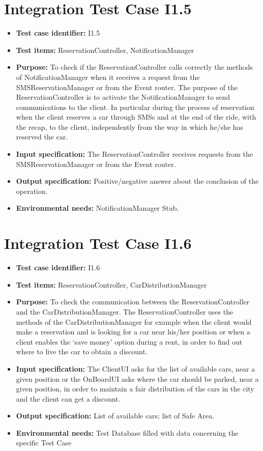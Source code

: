 \section{Integration Test Case I1.5}
\begin{itemize}
\item \textbf{Test case identifier:} I1.5
\item \textbf{Test items:} ReservationController, NotificationManager
\item \textbf{Purpose:} To check if the ReservationController calls correctly the methods of NotificationManager when it receives a request from the SMSReservationManager or from the Event router. The purpose of the ReservationController is to activate the NotificationManager to send communications to the client. In particular during the process of reservation when the client reserves a car through SMSs and at the end of the ride, with the recap, to the client, independently from the way in which he/she has reserved the car.
\item \textbf{Input specification:} The ReservationController receives requests from the SMSReservationManager or from the Event router.
\item \textbf{Output specification:} Positive/negative answer about the conclusion of the operation.
\item \textbf{Environmental needs:} NotificationManager Stub.
\end{itemize}

\section{Integration Test Case I1.6}
\begin{itemize}
\item \textbf{Test case identifier:} I1.6
\item \textbf{Test items:} ReservationController, CarDistributionManager
\item \textbf{Purpose:} To check the communication between the ReservationController and the CarDistributionManager. The ReservationController uses the methods of the CarDistributionManager for example when the client would make a reservation and is looking for a car near his/her position or when a client enables the ‘save money’ option during a rent, in order to find out where to live the car to obtain a discount.
\item \textbf{Input specification:} The ClientUI asks for the list of available cars, near a given position or the OnBoardUI asks where the car should be parked, near a given position, in order to maintain a fair distribution of the cars in the city and the client can get a discount.
\item \textbf{Output specification:} List of available cars; list of Safe Area.
\item \textbf{Environmental needs:} Test Database filled with data concerning the specific Test Case
\end{itemize}

